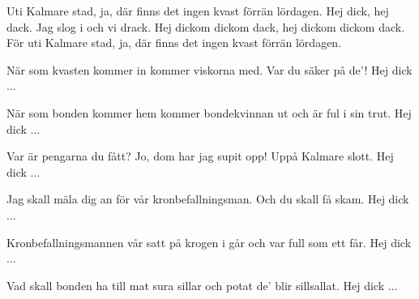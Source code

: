 

\beginverse*
Uti Kalmare stad,
ja, där finns det ingen kvast
förrän lördagen.
Hej dick,
hej dack.
Jag slog i
och vi drack.
Hej dickom dickom dack,
hej dickom dickom dack.
För uti Kalmare stad,
ja, där finns det ingen kvast
förrän lördagen.
\endverse

\beginverse*
När som kvasten kommer in
kommer viskorna med.
Var du säker på de'!
Hej dick ...
\endverse

\beginverse*
När som bonden kommer hem
kommer bondekvinnan ut
och är ful i sin trut.
Hej dick ...
\endverse

\beginverse*
Var är pengarna du fått?
Jo, dom har jag supit opp!
Uppå Kalmare slott.
Hej dick ...
\endverse

\beginverse*
Jag skall mäla dig an
för vår kronbefallningsman.
Och du skall få skam.
Hej dick ...
\endverse

\beginverse*
Kronbefallningsmannen vår
satt på krogen i går
och var full som ett får.
Hej dick ...
\endverse

\beginverse*
Vad skall bonden ha till mat
sura sillar och potat
de' blir sillsallat.
Hej dick ...
\endverse
\endsong

